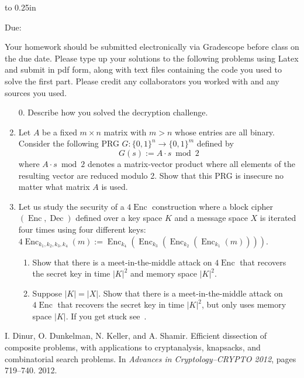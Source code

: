 \documentclass[letterpaper,12pt]{article}
\newcommand{\htitle}
{
    \vbox to 0.25in{}
    \noindent\parbox{\textwidth}
    {
        \course\hfill \assigndate\newline
        \coursename\hfill 
        Due: \duedate \vspace*{-.5ex}\newline
        \mbox{}\hrulefill\mbox{}
    }
    \vspace{8pt}
    \begin{center}{\Large\bf{\settitle}}\end{center}
}
\newcommand{\handout}
{
    \thispagestyle{empty}
    \markboth{}{}
    \pagestyle{plain}
    \htitle
}
\newcommand{\problemsetheader}
{
Your homework should be submitted electronically via Gradescope before class on the due date.  Please type up your solutions to the following problems using Latex and submit in pdf form, along with text files containing the code you used to solve the first part.  Please credit any collaborators you worked with and any sources you used.

\medskip

\hrulefill

\bigskip
}
\newcommand{\Enc}{\operatorname{Enc}}
\newcommand{\Dec}{\operatorname{Dec}}
\begin{document}
\handout
\setlength{\parindent}{0pt}
\problemsetheader

\begin{enumerate}

\item[0.] Describe how you solved the decryption challenge.

\item Let $A$ be a fixed $m \times n$ matrix with $m > n$ whose entries are all binary.  Consider the following PRG $G : \{0,1\}^n \rightarrow \{0,1\}^m$ defined by
  \[
  G(s) := A \cdot s \bmod 2
  \]
  where $A \cdot s \bmod 2$ denotes a matrix-vector product where all elements of the resulting vector are reduced modulo 2.  Show that this PRG is insecure no matter what matrix $A$ is used.

\item Let us study the security of a $4\Enc$ construction where a block cipher $(\Enc, \Dec)$ defined over a key space $K$ and a message space $X$ is iterated four times using four different keys: $4\Enc_{k_1,k_2,k_3,k_4}(m) := \Enc_{k_4}(\Enc_{k_3}(\Enc_{k_2}(\Enc_{k_1}(m))))$.

  \begin{enumerate}
  \item Show that there is a meet-in-the-middle attack on $4\Enc$ that recovers the secret key in time $|K|^2$ and memory space $|K|^2$.
    
    \item Suppose $|K| = |X|$.  Show that there is a meet-in-the-middle attack on $4\Enc$ that recovers the secret key in time $|K|^2$, but only uses memory space $|K|$.  If you get stuck see~\cite{doks12}.
  
  \end{enumerate}
\end{enumerate}
\vfill

\begin{thebibliography}{1}
 I. Dinur, O. Dunkelman, N. Keller, and A. Shamir. Efficient dissection of composite problems, with applications to cryptanalysis, knapsacks, and combinatorial search problems. In
\textit{Advances in Cryptology--CRYPTO 2012}, pages 719--740. 2012.
  
\end{thebibliography}
\end{document}
